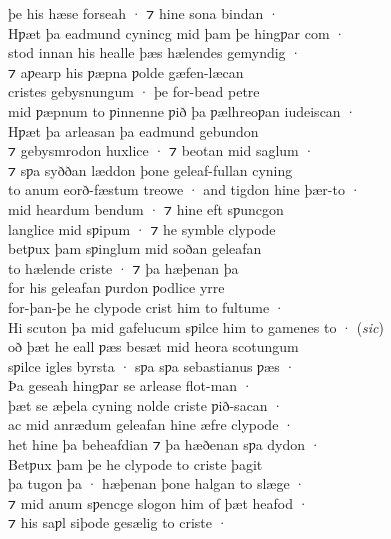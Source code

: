 \documentclass[10pt]{book}
\begin{document}
\settowidth{}

\begin{center}
\parbox{\pagelen}{
þe his h\ae{}se forseah · ⁊ hine sona bindan · \\
Hƿ\ae{}t þa eadmund cynincg mid þam þe hingƿar com · \\
stod innan his healle þ\ae{}s h\ae{}lendes gemyndig · \\
⁊ aƿearp his ƿ\ae{}pna ƿolde g\ae{}fen-l\ae{}can \\
cristes gebysnungum · þe for-bead petre \\
mid ƿ\ae{}pnum to ƿinnenne ƿið þa ƿ\ae{}lhreoƿan iudeiscan · \\
Hƿ\ae{}t þa arleasan þa eadmund gebundon \\
⁊ gebysmrodon huxlice · ⁊ beotan mid saglum · \\
⁊ sƿa syððan l\ae{}ddon þone geleaf-fullan cyning \\
to anum eorð-f\ae{}stum treowe · and tigdon hine þ\ae{}r-to · \\
mid heardum bendum · ⁊ hine eft sƿuncgon \\
langlice mid sƿipum · ⁊ he symble clypode \\
betƿux þam sƿinglum mid soðan geleafan \\
to h\ae{}lende criste · ⁊ þa h\ae{}þenan þa \\
for his geleafan ƿurdon ƿodlice yrre \\
for-þan-þe he clypode crist him to fultume · \\
Hi scuton þa mid gafelucum sƿilce him to gamenes to · (\emph{sic}) \\
oð þ\ae{}t he eall ƿ\ae{}s bes\ae{}t mid heora scotungum \\ 
sƿilce igles byrsta · sƿa sƿa sebastianus ƿ\ae{}s · \\
Þa geseah hingƿar se arlease flot-man · \\
þ\ae{}t se \ae{}þela cyning nolde criste ƿið-sacan · \\
ac mid anr\ae{}dum geleafan hine \ae{}fre clypode · \\
het hine þa beheafdian ⁊ þa h\ae{}ðenan sƿa dydon · \\
Betƿux þam þe he clypode to criste þagit \\
þa tugon þa · h\ae{}þenan þone halgan to sl\ae{}ge · \\
⁊ mid anum sƿencge slogon him of þ\ae{}t heafod · \\
⁊ his saƿl siþode ges\ae{}lig to criste · \\
}
\end{center}
\end{document}
